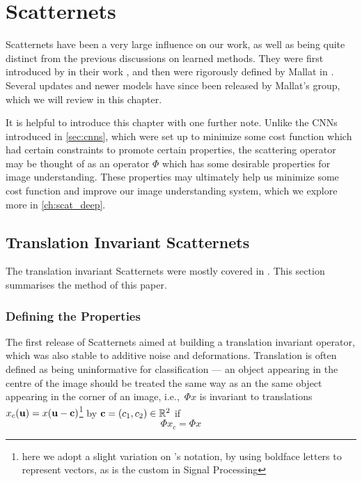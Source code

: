 \section{Scatternets}\label{ch:scatternets}
  Scatternets have been a very large influence on
  our work, as well as being quite distinct from the previous discussions on
  learned methods. They were first introduced by  
  \citeauthor{bruna_classification_2011} in their work 
  \cite{bruna_classification_2011}, and then were rigorously defined by Mallat
  in \cite{mallat_group_2012}. Several updates and newer models have since
  been released by Mallat's group, which we will review in this chapter.
  
  It is helpful to introduce this chapter with one further note. Unlike the
  CNNs introduced in \autoref{sec:cnns}, which were set up to minimize some
  cost function which had certain constraints to promote certain properties,
  the scattering operator may be thought of as an operator $\Phi$ which has
  some desirable properties for image understanding. These properties may
  ultimately help us minimize some cost function and improve our image
  understanding system, which we explore more in
  \autoref{ch:scat_deep}.


\subsection{Translation Invariant Scatternets}
  The translation invariant Scatternets were mostly covered in
  \cite{bruna_invariant_2013}. This section summarises the method of this
  paper.

\subsubsection{Defining the Properties}
  The first release of Scatternets aimed at building a translation invariant
  operator, which was also stable to additive noise and deformations. Translation
  is often defined as being uninformative for classification --- an object
  appearing in the centre of the image should be treated the same way as an
  the same object appearing in the corner of an image, i.e.,\ $\Phi x$ is
  invariant to translations $x_c(\mathbf{u}) = x(\mathbf{u}-\mathbf{c})$\footnote{here
  we adopt a slight variation on \Bruna's notation, by using boldface letters to
  represent vectors, as is the custom in Signal Processing} by 
  $\mathbf{c}=(c_1,c_2) \in \mathbb{R}^2$ if
  \begin{equation}\label{eq:scat_trans_invariance}
    \Phi x_c = \Phi x
  \end{equation}

